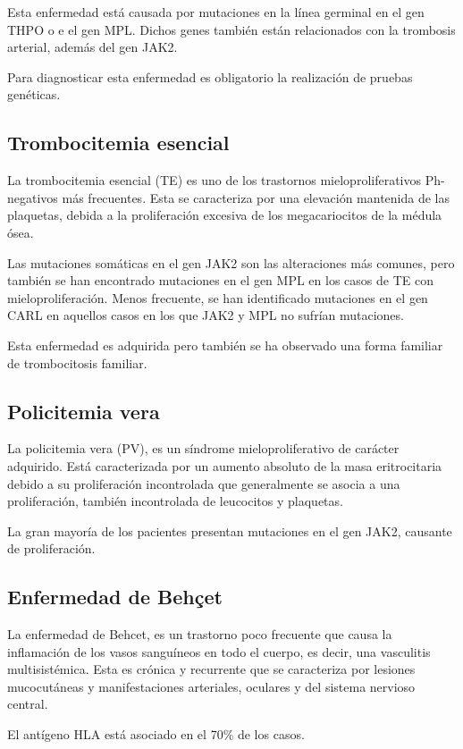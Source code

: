 Esta enfermedad está causada por mutaciones en la línea germinal en el gen THPO o e el gen MPL. Dichos genes también están relacionados con la trombosis arterial, además del gen JAK2.

Para diagnosticar esta enfermedad es obligatorio la realización de pruebas genéticas. 



\subsection{\textbf{Trombocitemia esencial}}

La trombocitemia esencial (TE) es uno de los trastornos mieloproliferativos Ph-negativos más frecuentes. Esta se caracteriza por una elevación mantenida de las plaquetas, debida a la proliferación excesiva de los megacariocitos de la médula ósea.

Las mutaciones somáticas en el gen JAK2 son las alteraciones más comunes, pero también se han encontrado mutaciones en el gen MPL en los casos de TE con mieloproliferación. Menos frecuente, se han identificado mutaciones en el gen CARL en aquellos casos en los que JAK2 y MPL no sufrían mutaciones. 

Esta enfermedad es adquirida pero también se ha observado una forma familiar de trombocitosis familiar.

\subsection{\textbf{Policitemia vera}}

La policitemia vera (PV), es un síndrome mieloproliferativo de carácter adquirido. Está caracterizada por un aumento absoluto de la masa eritrocitaria debido a su proliferación incontrolada que generalmente se asocia a una proliferación, también incontrolada de leucocitos y plaquetas.

La gran mayoría de los pacientes presentan mutaciones en el gen JAK2, causante de proliferación.

\subsection{\textbf{Enfermedad de Behçet}}

La enfermedad de Behcet, es un trastorno poco frecuente que causa la inflamación de los vasos sanguíneos en todo el cuerpo, es decir, una vasculitis multisistémica. Esta es crónica  y recurrente que se caracteriza por lesiones mucocutáneas y manifestaciones arteriales, oculares y del sistema nervioso central.

El antígeno HLA está asociado en el 70\% de los casos.  
